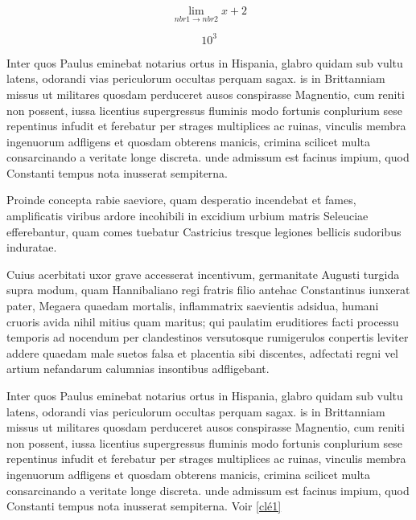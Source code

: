 \documentclass{report}
\begin{document}
\begin{equation}
 \lim_{nbr1 \to nbr2} x+2
\end{equation}

\begin{equation}
 10^{3}
\end{equation}


Inter quos Paulus eminebat notarius ortus in Hispania, glabro quidam sub vultu latens, odorandi vias periculorum occultas perquam sagax. is in Brittanniam missus ut militares quosdam perduceret ausos conspirasse Magnentio, cum reniti non possent, iussa licentius supergressus fluminis modo fortunis conplurium sese repentinus infudit et ferebatur per strages multiplices ac ruinas, vinculis membra ingenuorum adfligens et quosdam obterens manicis, crimina scilicet multa consarcinando a veritate longe discreta. unde admissum est facinus impium, quod Constanti tempus nota inusserat sempiterna.

Proinde concepta rabie saeviore, quam desperatio incendebat et fames, amplificatis viribus ardore incohibili in excidium urbium matris Seleuciae efferebantur, quam comes tuebatur Castricius tresque legiones bellicis sudoribus induratae.

Cuius acerbitati uxor grave accesserat incentivum, germanitate Augusti turgida supra modum, quam Hannibaliano regi fratris filio antehac Constantinus iunxerat pater, Megaera quaedam mortalis, inflammatrix saevientis adsidua, humani cruoris avida nihil mitius quam maritus; qui paulatim eruditiores facti processu temporis ad nocendum per clandestinos versutosque rumigerulos conpertis leviter addere quaedam male suetos falsa et placentia sibi discentes, adfectati regni vel artium nefandarum calumnias insontibus adfligebant.

\newpage

Inter quos Paulus eminebat notarius ortus in Hispania, glabro quidam sub vultu latens, odorandi vias periculorum occultas perquam sagax. is in Brittanniam missus ut militares quosdam perduceret ausos conspirasse Magnentio, cum reniti non possent, iussa licentius supergressus fluminis modo fortunis conplurium sese repentinus infudit et ferebatur per strages multiplices ac ruinas, vinculis membra ingenuorum adfligens et quosdam obterens manicis, crimina scilicet multa consarcinando a veritate longe discreta. unde admissum est facinus impium, quod Constanti tempus nota inusserat sempiterna.
Voir \ref {clé1}

\end{document}

